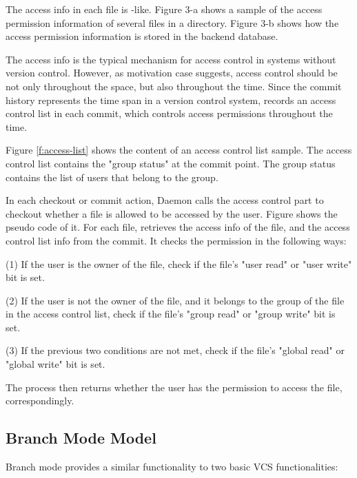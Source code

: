 The access info in each file is \unix-like.
Figure 3-a  shows a sample of the access permission
information of several files in a directory. Figure 3-b
shows how the access
permission information is stored in the backend \git database.

The access info is the typical mechanism for access control in systems
without version control. However, as motivation case  suggests, access control should be not only
throughout the space, but also throughout the time. Since the
commit history represents the time span in a version control system, \sys
records an access control list in each commit, which controls access permissions
throughout the time.



Figure \ref{f:access-list} shows the content of an access control
list sample. The access control list contains the "group status" at the commit
point. The group status contains the list of users that belong to the group.

In each checkout or commit action, \Sys Daemon calls the access control part to
checkout whether a file is allowed to be accessed by the user. Figure
 shows the pseudo code of it.
For each file, \sys retrieves the access info of the file, and the access
control list info from the commit. It checks the permission in the following
ways:

(1) If the user is the owner of the file, check if the file's "user read" or
"user write" bit is set.

(2) If the user is not the owner of the file, and it belongs to the group of the
file in the access control list, check if the file's "group read" or "group
write" bit is set.

(3) If the previous two conditions are not met, check if the file's "global
read" or "global write" bit is set.

The process then returns whether the user has the permission to access the file,
correspondingly.


\subsection{Branch Mode Model}

Branch mode provides a similar functionality to two basic VCS functionalities:

